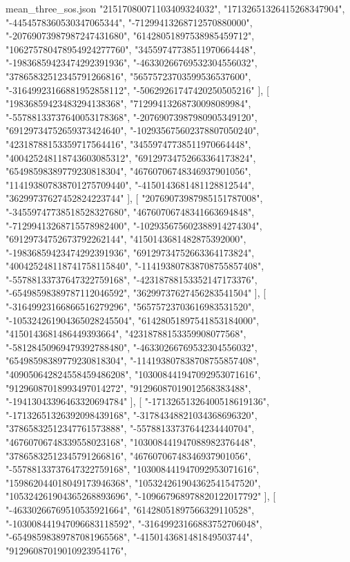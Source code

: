 \begin{filecontents*}[overwrite]{mean_three_sos.json}
    "21517080071103409324032",
    "17132651326415268347904",
    "-4454578360530347065344",
    "-71299413268712570880000",
    "-20769073987987247431680",
    "61428051897538985459712",
    "106275780478954924277760",
    "34559747738511970664448",
    "-19836859423474292391936",
    "-46330266769532304556032",
    "37865832512345791266816",
    "56575723703599536537600",
    "-31649923166881952858112",
    "-50629261747420250505216"
   ],
   [
    "19836859423483294138368",
    "71299413268730098089984",
    "-55788133737640053178368",
    "-20769073987980905349120",
    "69129734752659373424640",
    "-102935675602378807050240",
    "42318788153359717564416",
    "34559747738511970664448",
    "400425248118743603085312",
    "69129734752663364173824",
    "65498598389779230818304",
    "46760706748346937901056",
    "114193807838701275709440",
    "-4150143681481128812544",
    "36299737627452824223744"
   ],
   [
    "20769073987985151787008",
    "-34559747738518528327680",
    "46760706748341663694848",
    "-71299413268715578982400",
    "-102935675602388914274304",
    "69129734752673792262144",
    "4150143681482875392000",
    "-19836859423474292391936",
    "69129734752663364173824",
    "400425248118741758115840",
    "-114193807838708755857408",
    "-55788133737647322759168",
    "-42318788153352147173376",
    "-65498598389787112046592",
    "36299737627456283541504"
   ],
   [
    "-31649923166866516279296",
    "56575723703616983531520",
    "-105324261904365028245504",
    "61428051897541853184000",
    "4150143681486449393664",
    "42318788153359908077568",
    "-58128450969479392788480",
    "-46330266769532304556032",
    "65498598389779230818304",
    "-114193807838708755857408",
    "409050642824558459486208",
    "103008441947092953071616",
    "91296087018993497014272",
    "91296087019012568383488",
    "-19413043396463320694784"
   ],
   [
    "-17132651326400518619136",
    "-17132651326392098439168",
    "-31784348821034368696320",
    "37865832512347761573888",
    "-55788133737644234440704",
    "46760706748339558023168",
    "103008441947088982376448",
    "37865832512345791266816",
    "46760706748346937901056",
    "-55788133737647322759168",
    "103008441947092953071616",
    "159862044018049173946368",
    "105324261904362541547520",
    "105324261904365268893696",
    "-109667968978820122017792"
   ],
   [
    "-46330266769510535921664",
    "61428051897566329110528",
    "-103008441947096683118592",
    "-31649923166883752706048",
    "-65498598389787081965568",
    "-4150143681481849503744",
    "91296087019010923954176",

\end{filecontents*}
